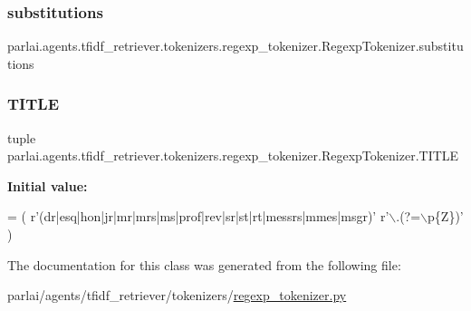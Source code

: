 \subsubsection{\texorpdfstring{substitutions}{substitutions}}
{\footnotesize\ttfamily parlai.\+agents.\+tfidf\+\_\+retriever.\+tokenizers.\+regexp\+\_\+tokenizer.\+Regexp\+Tokenizer.\+substitutions}

\mbox{\label{classparlai_1_1agents_1_1tfidf__retriever_1_1tokenizers_1_1regexp__tokenizer_1_1RegexpTokenizer_aafcf344a127c586b424b9bc2a6a80196}} 
\subsubsection{\texorpdfstring{T\+I\+T\+LE}{TITLE}}
{\footnotesize\ttfamily tuple parlai.\+agents.\+tfidf\+\_\+retriever.\+tokenizers.\+regexp\+\_\+tokenizer.\+Regexp\+Tokenizer.\+T\+I\+T\+LE\hspace{0.3cm}{\ttfamily [static]}}

{\bfseries Initial value\+:}
\begin{DoxyCode}
=  (
        \textcolor{stringliteral}{r'(dr|esq|hon|jr|mr|mrs|ms|prof|rev|sr|st|rt|messrs|mmes|msgr)'} \textcolor{stringliteral}{r'\(\backslash\).(?=\(\backslash\)p\{Z\})'}
    )
\end{DoxyCode}


The documentation for this class was generated from the following file\+:\begin{DoxyCompactItemize}
\item 
parlai/agents/tfidf\+\_\+retriever/tokenizers/\hyperlink{regexp__tokenizer_8py}{regexp\+\_\+tokenizer.\+py}\end{DoxyCompactItemize}
